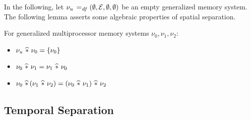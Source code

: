 \documentclass[11pt]{report}
\begin{document}
In the following, let $\nu_u \operatorname{\;=_{\mathit{df}}\;} (\operatorname{\emptyset}, \mathcal{E}, \operatorname{\emptyset}, \operatorname{\emptyset})$ be an empty generalized memory system. The following lemma asserts some algebraic properties of spatial separation. \begin{lemma}
  \label{lem:spatial-separation-algebra}
  For generalized multiprocessor memory systems $\nu_0, \nu_1, \nu_2$: 
  \begin{itemize}
    \item $\nu_u \operatorname{\,\widehat{\ast}\,} \nu_0 = \left\lbrace \nu_0 \right\rbrace$
    \item $\nu_0 \operatorname{\,\widehat{\ast}\,} \nu_1 = \nu_1 \operatorname{\,\widehat{\ast}\,} \nu_0$
    \item $\nu_0 \operatorname{\,\widehat{\ast}\,} (\nu_1 \operatorname{\,\widehat{\ast}\,} \nu_2) = (\nu_0 \operatorname{\,\widehat{\ast}\,} \nu_1) \operatorname{\,\widehat{\ast}\,} \nu_2$
  \end{itemize}
\end{lemma}

\subsection{Temporal Separation}
\label{sec:temporal-separation}
\end{document}
